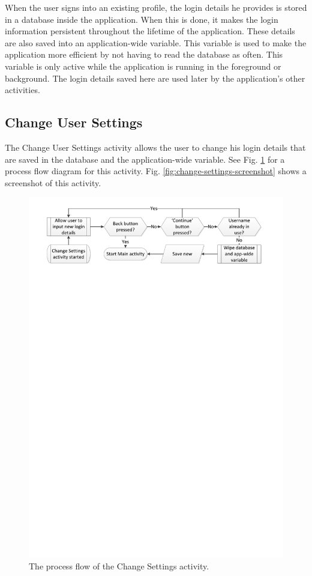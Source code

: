 When the user signs into an existing profile, the login details he provides
is stored in a database inside the application. When this is done, it
makes the login information persistent throughout the lifetime of the application. These
details are also saved into an application-wide variable. This variable is used to make
the application more efficient by not having to read the database as often. This variable
is only active while the application is running in the foreground or background. The
login details saved here are used later by the application's other activities.

\subsection{Change User Settings}

The Change User Settings activity allows the user to change his login
details that are saved in the database and the application-wide variable. See Fig.
\ref{fig:change-user-settings} for a process flow diagram for this
activity. Fig. \ref{fig:change-settings-screenshot} shows a screenshot of this
activity.

\begin{figure}
 \centering 
 \includegraphics[clip = true, trim = 0 680 0 20,
 scale=0.7]{change_settings_processflow}
 \caption{The process flow of the Change Settings activity.}
 \label{fig:change-user-settings}
\end{figure}

